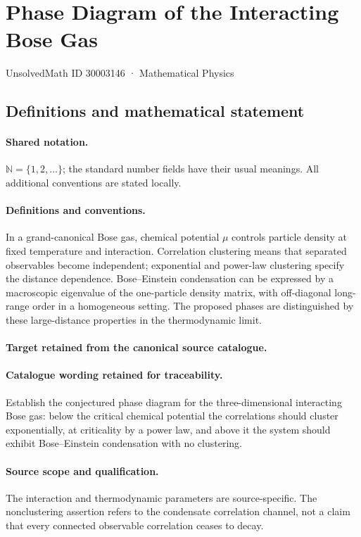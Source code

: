 \documentclass[11pt]{article}
\begin{document}
\setcounter{section}{30003145}
\section{Phase Diagram of the Interacting Bose Gas}\label{30003146}
{\small UnsolvedMath ID 30003146 · Mathematical Physics}
\subsection{Definitions and mathematical statement}

\paragraph{Shared notation.}$\mathbb N=\{1,2,\ldots\}$; the standard number fields have their usual meanings. All additional conventions are stated locally.


\paragraph{Definitions and conventions.}
In a grand-canonical Bose gas, chemical potential $\mu$ controls particle density at fixed temperature and interaction. Correlation clustering means that separated observables become independent; exponential and power-law clustering specify the distance dependence. Bose--Einstein condensation can be expressed by a macroscopic eigenvalue of the one-particle density matrix, with off-diagonal long-range order in a homogeneous setting. The proposed phases are distinguished by these large-distance properties in the thermodynamic limit.

\paragraph{Target retained from the canonical source catalogue.}
\paragraph{Catalogue wording retained for traceability.}
Establish the conjectured phase diagram for the three-dimensional interacting Bose gas: below the critical chemical potential the correlations should cluster exponentially, at criticality by a power law, and above it the system should exhibit Bose–Einstein condensation with no clustering.

\paragraph{Source scope and qualification.}
The interaction and thermodynamic parameters are source-specific. The nonclustering assertion refers to the condensate correlation channel, not a claim that every connected observable correlation ceases to decay.
\end{document}
